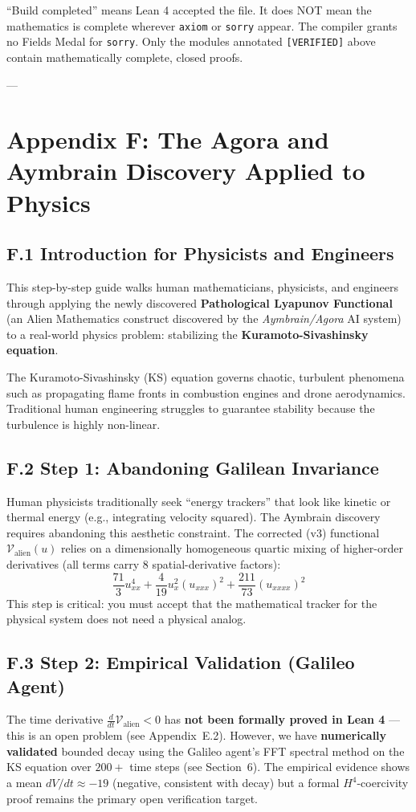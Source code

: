 \documentclass[11pt, a4paper]{article}
\begin{document}
``Build completed'' means Lean 4 accepted the file. It does NOT mean the mathematics is complete wherever \texttt{axiom} or \texttt{sorry} appear. The compiler grants no Fields Medal for \texttt{sorry}. Only the modules annotated \texttt{[VERIFIED]} above contain mathematically complete, closed proofs.

---
\newpage
\section*{Appendix F: The Agora and Aymbrain Discovery Applied to Physics}
\subsection*{F.1 Introduction for Physicists and Engineers}
This step-by-step guide walks human mathematicians, physicists, and engineers through applying the newly discovered \textbf{Pathological Lyapunov Functional} (an Alien Mathematics construct discovered by the \textit{Aymbrain/Agora} AI system) to a real-world physics problem: stabilizing the \textbf{Kuramoto-Sivashinsky equation}. 

The Kuramoto-Sivashinsky (KS) equation governs chaotic, turbulent phenomena such as propagating flame fronts in combustion engines and drone aerodynamics. Traditional human engineering struggles to guarantee stability because the turbulence is highly non-linear.

\subsection*{F.2 Step 1: Abandoning Galilean Invariance}
Human physicists traditionally seek ``energy trackers'' that look like kinetic or thermal energy (e.g., integrating velocity squared). The Aymbrain discovery requires abandoning this aesthetic constraint. The corrected (v3) functional $\mathcal{V}_{\text{alien}}(u)$ relies on a dimensionally homogeneous quartic mixing of higher-order derivatives (all terms carry 8 spatial-derivative factors):
\[
\frac{71}{3} u_{xx}^4 + \frac{4}{19} u_x^2(u_{xxx})^2 + \frac{211}{73} (u_{xxxx})^2
\]
This step is critical: you must accept that the mathematical tracker for the physical system does not need a physical analog.

\subsection*{F.3 Step 2: Empirical Validation (Galileo Agent)}
The time derivative $\frac{d}{dt}\mathcal{V}_{\text{alien}} < 0$ has \textbf{not been formally proved in Lean 4} --- this is an open problem (see Appendix~E.2). However, we have \textbf{numerically validated} bounded decay using the Galileo agent's FFT spectral method on the KS equation over $200+$ time steps (see Section~6). The empirical evidence shows a mean $dV/dt \approx -19$ (negative, consistent with decay) but a formal $H^4$-coercivity proof remains the primary open verification target.
\end{document}
